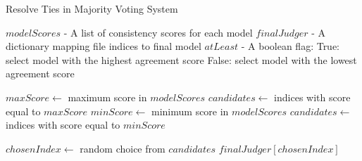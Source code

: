\begin{algorithm}
    \caption{Resolve Ties in Majority Voting System}
    \begin{algorithmic}[1]
        \Require
        \Statex $modelScores$ - A list of consistency scores for each model
        \Statex $finalJudger$ - A dictionary mapping file indices to final model
        \Statex $atLeast$ - A boolean flag:
        \Statex \hspace{1em} True: select model with the highest agreement score
        \Statex \hspace{1em} False: select model with the lowest agreement score

                \State $maxScore \gets $ maximum score in $modelScores$
                \State $candidates \gets $ indices with score equal to $maxScore$
            \Else
                \State $minScore \gets $ minimum score in $modelScores$
                \State $candidates \gets $ indices with score equal to $minScore$
            \EndIf

            \State $chosenIndex \gets $ random choice from $candidates$
            \State \Return $finalJudger[chosenIndex]$
        \EndProcedure
    \end{algorithmic}\label{alg:model-selection}
\end{algorithm}
